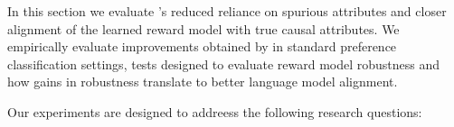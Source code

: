 In this section we evaluate \carma{}'s reduced reliance on spurious attributes and closer alignment of the learned reward model with true causal attributes. We empirically evaluate improvements obtained by \carma{} in standard preference classification settings, tests designed to evaluate reward model robustness and how gains in robustness translate to better language model alignment.

Our experiments are designed to addreess the following research questions:




